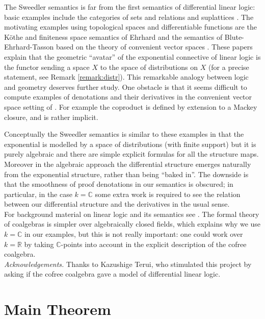 \documentclass[english,letter paper,12pt,reqno]{article}
\theoremstyle{example}
\begin{document}
The Sweedler semantics is far from the first semantics of differential linear logic: basic examples include the categories of sets and relations \cite[\S 2.5.1]{blutecs} and suplattices \cite[\S 2.5.2]{blutecs}. The motivating examples using topological spaces and differentiable functions are the K\"othe and finiteness space semantics of Ehrhard \cite{ehrhard-kothe, ehrhard-finiteness} and the semantics of Blute-Ehrhard-Tasson \cite{blutecon} based on the theory of convenient vector spaces \cite{frolicher}. These papers explain that the geometric ``avatar'' of the exponential connective of linear logic is the functor sending a space $X$ to the space of distributions on $X$ (for a precise statement, see Remark \ref{remark:distr}). This remarkable analogy between logic and geometry deserves further study. One obstacle is that it seems difficult to compute examples of denotations and their derivatives in the convenient vector space setting of \cite{blutecon}. For example the coproduct \cite[p.12]{blutecon} is defined by extension to a Mackey closure, and is rather implicit.

Conceptually the Sweedler semantics is similar to these examples in that the exponential is modelled by a space of distributions (with finite support) but it is purely algebraic and there are simple explicit formulas for all the structure maps. Moreover in the algebraic approach the differential structure emerges naturally from the exponential structure, rather than being ``baked in''. The downside is that the smoothness of proof denotations in our semantics is obscured; in particular, in the case $k = \mathbb{C}$ some extra work is required to see the relation between our differential structure and the derivatives in the usual sense.
\\

For background material on linear logic and its semantics see \cite{girard_llogic, girard_prooftypes, mellies}. The formal theory of coalgebras is simpler over algebraically closed fields, which explains why we use $k = \mathbb{C}$ in our examples, but this is not really important: one could work over $k = \mathbb{R}$ by taking $\mathbb{C}$-points into account in the explicit description of the cofree coalgebra.
\\

\emph{Acknowledgements.} Thanks to Kazushige Terui, who stimulated this project by asking if the cofree coalgebra gave a model of differential linear logic.

\section{Main Theorem}
\end{document}
